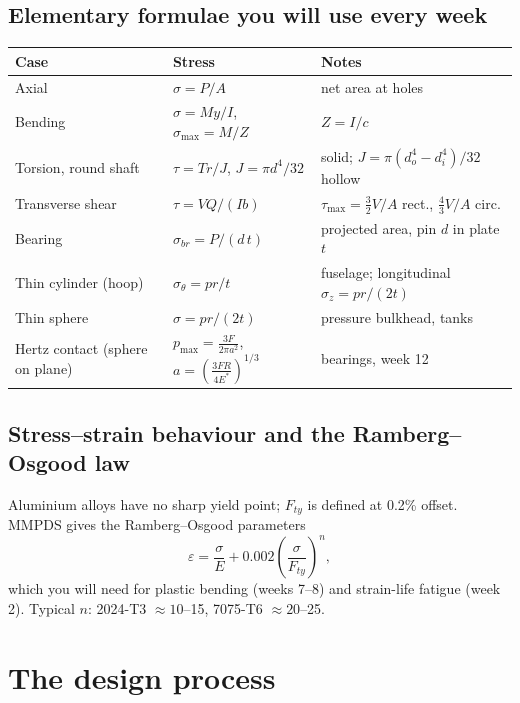 \documentclass[11pt,a4paper]{article}
\begin{document}
\subsection{Elementary formulae you will use every week}

\begin{center}\footnotesize
\begin{tabular}{@{}lll@{}}
\toprule
Case & Stress & Notes \\
\midrule
Axial & $\sigma = P/A$ & net area at holes \\
Bending & $\sigma = My/I$, $\sigma_{\max}=M/Z$ & $Z=I/c$ \\
Torsion, round shaft & $\tau = Tr/J$, $J=\pi d^4/32$ & solid; $J=\pi(d_o^4-d_i^4)/32$ hollow \\
Transverse shear & $\tau = VQ/(Ib)$ & $\tau_{\max}=\frac{3}{2}V/A$ rect., $\frac{4}{3}V/A$ circ. \\
Bearing & $\sigma_{br} = P/(d\,t)$ & projected area, pin $d$ in plate $t$ \\
Thin cylinder (hoop) & $\sigma_\theta = pr/t$ & fuselage; longitudinal $\sigma_z = pr/(2t)$ \\
Thin sphere & $\sigma = pr/(2t)$ & pressure bulkhead, tanks \\
Hertz contact (sphere on plane) & $p_{\max}=\frac{3F}{2\pi a^2}$, $a=\left(\frac{3FR}{4E^*}\right)^{1/3}$ & bearings, week 12 \\
\bottomrule
\end{tabular}
\end{center}

\subsection{Stress--strain behaviour and the Ramberg--Osgood law}

Aluminium alloys have no sharp yield point; $F_{ty}$ is defined at 0.2\% offset. MMPDS gives the Ramberg--Osgood parameters
\begin{equation}
  \varepsilon = \frac{\sigma}{E} + 0.002\left(\frac{\sigma}{F_{ty}}\right)^{n},
\end{equation}
which you will need for plastic bending (weeks 7--8) and strain-life fatigue (week 2). Typical $n$: 2024-T3 $\approx 10$--15, 7075-T6 $\approx 20$--25.


\section{The design process}
\end{document}
